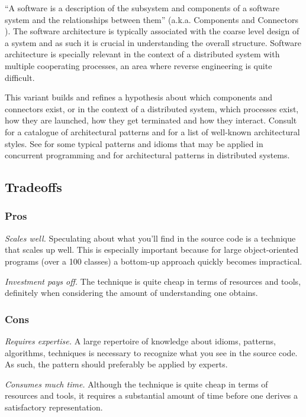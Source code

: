 \documentclass[a4paper,10pt,twoside]{book}
\begin{document}
``A software  is a description of the subsystem and components of a 
software system and the relationships between them'' \cite{Busc96a} (a.k.a. Components and 
Connectors \cite{Shaw96a}). The software architecture is typically associated with the 
coarse level design of a system and as such it is crucial in understanding the overall 
structure. Software architecture is specially relevant in the context of a distributed 
system with multiple cooperating processes, an area where reverse engineering is quite 
difficult.

This variant builds and refines a hypothesis about which components and connectors exist, 
or in the context of a distributed system, which processes exist, how they are launched, 
how they get terminated and how they interact. Consult \cite{Busc96a} for a catalogue of 
architectural patterns and \cite{Shaw96a} for a list of well-known architectural styles. 
See \cite{Lea96a} for some typical patterns and idioms that may be applied in concurrent 
programming and \cite{Schm00a} for architectural patterns in distributed systems.

\subsection*{Tradeoffs}

\subsubsection*{Pros}

\begin{bulletlist}
\item \emph{Scales well.}
Speculating about what you'll find in the source code is a technique that scales up well. 
This is especially important because for large object-oriented programs (over a 100 
classes) a bottom-up approach quickly becomes impractical.

\item \emph{Investment pays off.}
The technique is quite cheap in terms of resources and tools, definitely when considering 
the amount of understanding one obtains.
\end{bulletlist}

\subsubsection*{Cons}

\begin{bulletlist}
\item \emph{Requires expertise.}
A large repertoire of knowledge about idioms, patterns, algorithms, techniques is necessary 
to recognize what you see in the source code. As such, the pattern should preferably be 
applied by experts.

\item \emph{Consumes much time.}
Although the technique is quite cheap in terms of resources and tools, it requires a 
substantial amount of time before one derives a satisfactory representation.
\end{bulletlist}
\end{document}
